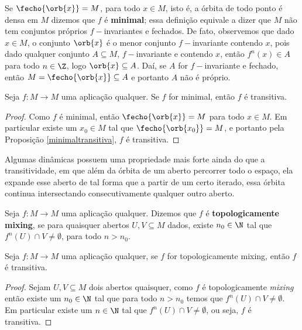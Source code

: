 Se $\fecho{\orb{x}}=M$, para todo $x\in M$, isto é, a órbita de todo ponto é densa em $M$ dizemos que $f$ é \textbf{minimal}; essa definição equivale a dizer que $M$ não tem conjuntos próprios $f-$invariantes e fechados. De fato, observemos que dado $x\in M$, o conjunto $\orb{x}$ é o menor conjunto $f-$invariante contendo $x$, pois dado qualquer conjunto $A\subseteq M$, $f-$invariante e contendo $x$, então $f^n(x)\in A$ para todo $n\in\Z$, logo $\orb{x}\subseteq A$. Daí, se $A$ for $f-$invariante e fechado, então $M=\fecho{\orb{x}}\subseteq A$ e portanto $A$ não é próprio.

\begin{corolario} Seja $f:M\to M$ uma aplicação qualquer. Se $f$ for minimal, então $f$ é transitiva.
\end{corolario}

\begin{proof} Como $f$ é minimal, então $\fecho{\orb{x}}=M$ para todo $x\in M$. Em particular existe um $x_0\in M$ tal que $\fecho{\orb{x_0}}=M$, e portanto pela Proposição \ref{minimaltransitiva}, $f$ é transitiva.
\end{proof}

Algumas dinâmicas possuem uma propriedade mais forte ainda do que a transitividade, em que além da órbita de um aberto percorrer todo o espaço, ela expande esse aberto de tal forma que a partir de um certo iterado, essa órbita continua intersectando consecutivamente qualquer outro aberto.

\begin{definicao} Seja $f:M\to M$ uma aplicação qualquer. Dizemos que $f$ é \textbf{topologicamente mixing}, se para quaisquer abertos $U,V\subseteq M$ dados, existe $n_0\in\N$ tal que $f^n(U)\cap V\neq\emptyset$, para todo $n>n_0$.
\end{definicao}

\begin{proposicao}\label{mixingtransitiva} Seja $f:M\to M$ uma aplicação qualquer, se $f$ for topologicamente mixing, então $f$ é transitiva.
\end{proposicao}

\begin{proof}Sejam $U,V\subseteq M$ dois abertos quaisquer, como $f$ é topologicamente \textit{mixing} então existe um $n_0\in\N$ tal que para todo $n>n_0$ temos que $f^n(U)\cap V\neq\emptyset$. Em particular existe um $n\in\N$ tal que $f^n(U)\cap V\neq\emptyset$, ou seja, $f$ é transitiva.
\end{proof}

